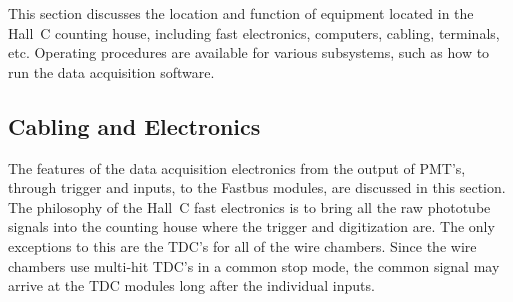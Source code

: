 This section discusses the location and function of equipment located in the
Hall~C counting house, including fast electronics, computers, cabling,
terminals, etc.
Operating procedures are available for various subsystems, such as how to
run the data acquisition software.

\subsection{Cabling and Electronics}

The features of the data acquisition
electronics from the output of PMT's, through trigger and inputs, to
the Fastbus modules, are discussed in this section.
The philosophy of the Hall~C fast electronics is to bring all the
raw phototube signals into the counting house where the trigger and
digitization are. The only exceptions to this are the TDC's for all of
the wire chambers. Since the wire chambers use multi-hit TDC's in a
common stop mode, the common signal may arrive at the TDC modules long
after the individual inputs.

